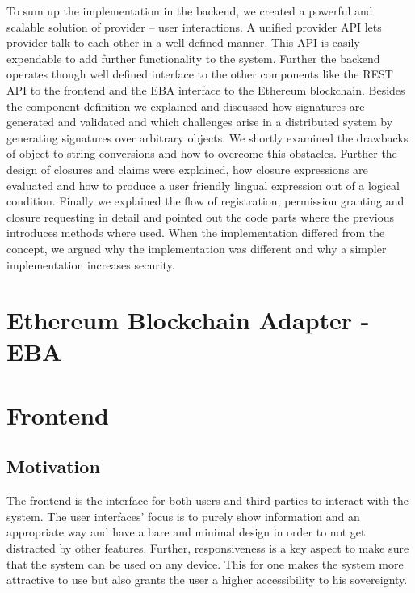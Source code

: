 To sum up the implementation in the backend, we created a powerful and scalable solution of provider – user interactions. A unified provider API lets provider talk to each other in a well defined manner. This API is easily expendable to add further functionality to the system. Further the backend operates though well defined interface to the other components like the REST API to the frontend and the EBA interface to the Ethereum blockchain. Besides the component definition we explained and discussed how signatures are generated and validated and which challenges arise in a distributed system by generating signatures over arbitrary objects.  We shortly examined the drawbacks of object to string conversions and how to overcome this obstacles. Further the design of closures and claims were explained, how closure expressions are evaluated and how to produce a user friendly lingual expression out of a logical condition. Finally we explained the flow of registration, permission granting and closure requesting in detail and pointed out the code parts where the previous introduces methods where used. When the implementation differed from the concept, we argued why the implementation was different and why a simpler implementation increases security.


\section{Ethereum Blockchain Adapter - EBA}
\label{sec:eba}


\section{Frontend}
\label{sec:frontend}


\subsection{Motivation}

The frontend is the interface for both users and third parties to interact with the system.
The user interfaces' focus is to purely show information and an appropriate way and have a bare and minimal design
in order to not get distracted by other features.
Further, responsiveness is a key aspect to make sure that the system can be used on any device. This for one makes the
system more attractive to use but also grants the user a higher accessibility to his sovereignty.

